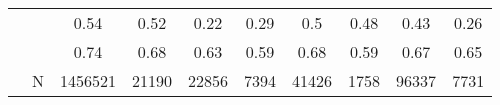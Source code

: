 \begin{table}[ht]
\begin{tabular}{l>{\raggedright\arraybackslash}p{3.2cm}|cccccccc}
   & \multicolumn{1}{>{\raggedleft\arraybackslash}p{2.9cm}|}{\makebox[2.9cm][r]{Lives with Child }} & 0.54 & 0.52 & 0.22 & 0.29 & 0.5 & 0.48 & 0.43 & 0.26 \\ 
   & \multicolumn{1}{>{\raggedleft\arraybackslash}p{3.4cm}|}{\makebox[3.4cm][r]{Married/Cohabiting }} & 0.74 & 0.68 & 0.63 & 0.59 & 0.68 & 0.59 & 0.67 & 0.65 \\ 
   & N & 1456521 & 21190 & 22856 & 7394 & 41426 & 1758 & 96337 & 7731 \\ 
   \hline
\end{tabular}
\endgroup
\end{table}
